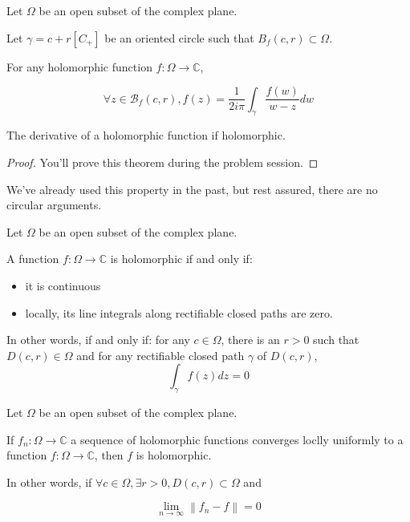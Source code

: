 \begin{thm*}
    Let $\Omega$ be an open subset of the complex plane. 

    Let $\gamma = c + r[C_+]$ be an oriented circle such that $B_f(c, r) \subset \Omega$.

    For any holomorphic function $f: \Omega \rightarrow \mathbb{C}$, 

    $$\forall z\in\mathcal{B}_f(c, r), f(z) = \frac{1}{2i\pi}\int_\gamma \frac{f(w)}{w - z}dw$$
\end{thm*}


\begin{thm*}
    The derivative of a holomorphic function if holomorphic.
\end{thm*}

\begin{proof}
    You'll prove this theorem during the problem session.
\end{proof}

\begin{note}
    We've already used this property in the past, but rest assured, there are no circular arguments.
\end{note}

\begin{thm*}
    Let $\Omega$ be an open subset of the complex plane. 

    A function $f: \Omega \rightarrow \mathbb{C}$ is holomorphic if and only if:

    \begin{itemize}
        \item it is continuous
        \item locally, its line integrals along rectifiable closed paths are zero.
    \end{itemize}

    In other words, if and only if: for any $c\in\Omega$, there is an $r > 0$ such that $D(c, r) \in \Omega$ and for any rectifiable closed path $\gamma$ of $D(c,r)$,
    $$\int_\gamma f(z)dz = 0 $$
\end{thm*}

\begin{thm*}
    Let $\Omega$ be an open subset of the complex plane. 

    If $f_n: \Omega \rightarrow \mathbb{C}$ a sequence of holomorphic functions converges loclly uniformly to a function $f: \Omega \rightarrow \mathbb{C}$, then $f$ is holomorphic.

    In other words, if $\forall c\in\Omega, \exists r > 0, D(c,r) \subset \Omega$ and 

    $$ \lim_{n\rightarrow \infty}\left\| f_n - f \right \|  = 0$$

\end{thm*}

